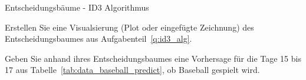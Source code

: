 \begin{task}[credit=16]{Entscheidungsbäume - ID3 Algorithmus}
\begin{subtask}[points=3,title=Visualisierung]
Erstellen Sie eine Visualsierung (Plot oder eingefügte Zeichnung) des Entscheidungsbaumes aus Aufgabenteil~\ref{q:id3_alg}.

 \begin{solution}
\end{solution}

\end{subtask}

\begin{subtask}[points=3,title=Vorhersage]
Geben Sie anhand ihres Entscheidungsbaumes eine Vorhersage für die Tage 15 bis 17 aus Tabelle~\ref{tab:data_baseball_predict}, ob Baseball gespielt wird.
\begin{solution}
\end{solution}
\end{subtask}
\end{task}